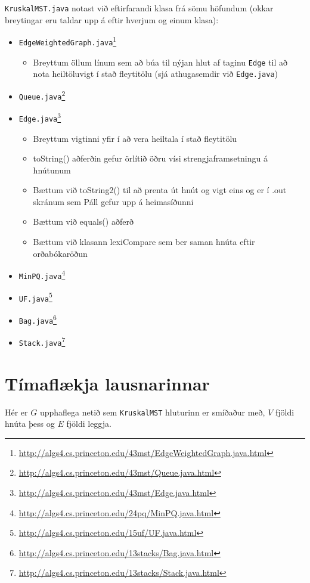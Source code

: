 \documentclass[a4paper,oneside]{article}
\begin{document}
\noindent
\texttt{KruskalMST.java} notast við eftirfarandi klasa frá sömu höfundum (okkar breytingar eru taldar upp á eftir hverjum og einum klasa):
\begin{itemize}
    \item \texttt{EdgeWeightedGraph.java}\footnote{\url{http://algs4.cs.princeton.edu/43mst/EdgeWeightedGraph.java.html}}
        \begin{itemize}
            \item Breyttum öllum línum sem að búa til nýjan hlut af taginu \texttt{Edge} til að nota heiltöluvigt í stað fleytitölu (sjá athugasemdir við \texttt{Edge.java})
        \end{itemize}
    \item \texttt{Queue.java}\footnote{\url{http://algs4.cs.princeton.edu/43mst/Queue.java.html}}
    \item \texttt{Edge.java}\footnote{\url{http://algs4.cs.princeton.edu/43mst/Edge.java.html}}
        \begin{itemize}
            \item Breyttum vigtinni yfir í að vera heiltala í stað fleytitölu
            \item toString() aðferðin gefur örlítið öðru vísi strengjaframsetningu á hnútunum 
            \item Bættum við toString2() til að prenta út hnút og vigt eins og er í .out skránum sem Páll gefur upp á heimasíðunni
            \item Bættum við equals() aðferð
            \item Bættum við klasann lexiCompare sem ber saman hnúta eftir orðabókaröðun
        \end{itemize}
    \item \texttt{MinPQ.java}\footnote{\url{http://algs4.cs.princeton.edu/24pq/MinPQ.java.html}}
    \item \texttt{UF.java}\footnote{\url{http://algs4.cs.princeton.edu/15uf/UF.java.html}}
    \item \texttt{Bag.java}\footnote{\url{http://algs4.cs.princeton.edu/13stacks/Bag.java.html}}
    \item \texttt{Stack.java}\footnote{\url{http://algs4.cs.princeton.edu/13stacks/Stack.java.html}}
\end{itemize}


\section{Tímaflækja lausnarinnar}
Hér er $G$ upphaflega netið sem \texttt{KruskalMST} hluturinn er smíðaður með, $V$ fjöldi hnúta þess og $E$ fjöldi leggja.
\end{document}
